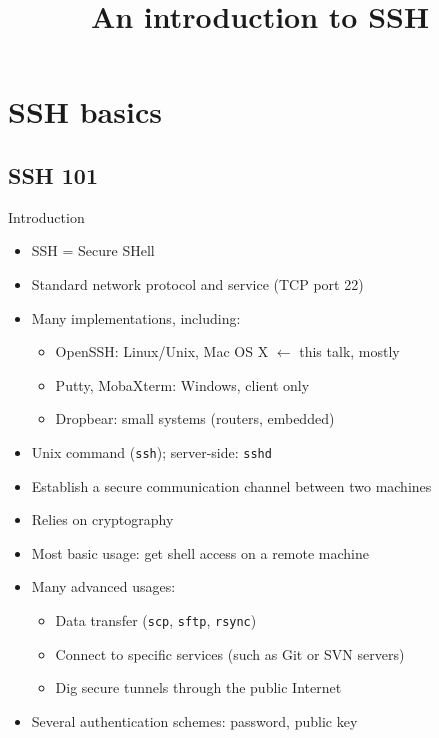 \documentclass[11pt,final,usepdftitle=false]{beamer}
\title{An introduction to SSH}
\date{}
\begin{document}
\frame{\titlepage}

\section{SSH basics}
\subsection{SSH 101}
\begin{frame}{Introduction}
\begin{itemize}
\item SSH = Secure SHell
\item Standard network protocol and service (TCP port 22)
\item Many implementations, including:
	\begin{itemize}
		\item OpenSSH: Linux/Unix, Mac OS X \alert{$\leftarrow$ this talk, mostly}
		\item Putty, MobaXterm: Windows, client only
		\item Dropbear: small systems (routers, embedded)
	\end{itemize}
\item Unix command (\texttt{ssh}); server-side: \texttt{sshd}
\item Establish a \alert{secure communication channel} between two machines
\item Relies on cryptography
\item Most basic usage: \alert{get shell access} on a remote machine
\item Many advanced usages:
	\begin{itemize}
		\item Data transfer (\texttt{scp}, \texttt{sftp}, \texttt{rsync})
		\item Connect to specific services (such as Git or SVN servers)
		\item Dig secure tunnels through the public Internet
	\end{itemize}
\item Several authentication schemes: password, public key
\end{itemize}
\end{frame}
\end{document}
